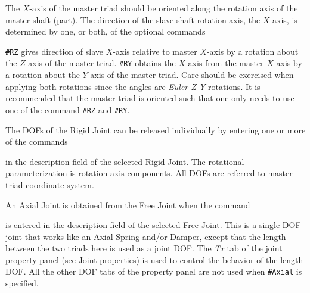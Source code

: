 The $X$-axis of the master triad should be oriented along the rotation axis of
the master shaft (part). The direction of the slave shaft rotation axis,
the $X$-axis, is determined by one, or both, of the optional commands


\noindent
{\tt\#RZ} gives direction of slave $X$-axis relative to master $X$-axis by a
rotation about the $Z$-axis of the master triad. {\tt\#RY} obtains the $X$-axis
from the master $X$-axis by a rotation about the $Y$-axis of the master triad.
Care should be exercised when applying both rotations since the angles are
{\sl Euler-Z-Y} rotations. It is recommended that the master triad is oriented
such that one only needs to use one of the command {\tt\#RZ} and {\tt\#RY}.


\clearpage



The DOFs of the Rigid Joint can be released individually by entering one
or more of the commands


\noindent
in the description field of the selected Rigid Joint. The rotational
parameterization is rotation axis components. All DOFs are referred to
master triad coordinate system.



An Axial Joint is obtained from the Free Joint when the command


\noindent
is entered in the description field of the selected Free Joint.
This is a single-DOF joint that works like an Axial Spring and/or Damper,
except that the length between the two triads here is used as a joint DOF.
The {\sl Tx} tab of the joint property panel (see 
{Joint properties}) is used to control the behavior of the length DOF.
All the other DOF tabs of the property panel are not used when {\tt\#Axial}
is specified.


